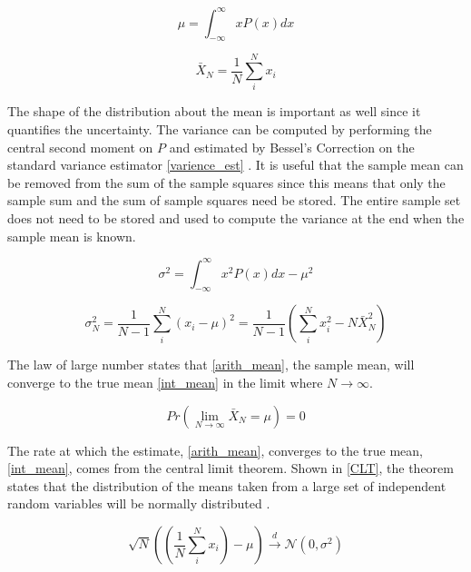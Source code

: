 \begin{equation}
\label{int_mean}
\mu = \int_{-\infty}^{\infty} x P(x) dx
\end{equation}

\begin{equation}
\label{arith_mean}
\bar{X}_N = \frac{1}{N} \sum_i^N x_i
\end{equation}

The shape of the distribution about the mean is important as well since it quantifies the uncertainty.  The variance can be computed by performing the central second moment on $P$ and estimated by Bessel's Correction on the standard variance estimator \eqref{varience_est} \cite{openmc}.  It is useful that the sample mean can be removed from the sum of the sample squares since this means that only the sample sum and the sum of sample squares need be stored.  The entire sample set does not need to be stored and used to compute the variance at the end when the sample mean is known.

\begin{equation}
\label{varience}
\sigma^2 = \int_{-\infty}^{\infty} x^2 P(x) dx- \mu^2
\end{equation}

\begin{equation}
\label{varience_est}
\sigma_N^2 =  \frac{1}{N-1} \sum_i^N (x_i-\mu)^2 =  \frac{1}{N-1} \left( \sum_i^N x_i^2-N\bar{X}_N^2 \right)
\end{equation}

The law of large number states that \eqref{arith_mean}, the sample mean, will converge to the true mean \eqref{int_mean} in the limit where $N\rightarrow\infty$.  

\begin{equation}
\label{LLN}
Pr\left(\lim_{N\rightarrow\infty} \bar{X}_N = \mu \right) =0
\end{equation}

The rate at which the estimate, \eqref{arith_mean}, converges to the true mean, \eqref{int_mean}, comes from the central limit theorem.  Shown in \eqref{CLT}, the theorem states that the distribution of the means taken from a large set of independent random variables will be normally distributed \cite{openmc}.  

\begin{equation}
\label{CLT}
\sqrt{N}\left(\left(\frac{1}{N} \sum_i^N x_i \right)-\mu\right) \xrightarrow[]{d} \mathcal{N}(0,\sigma^2)
\end{equation}

